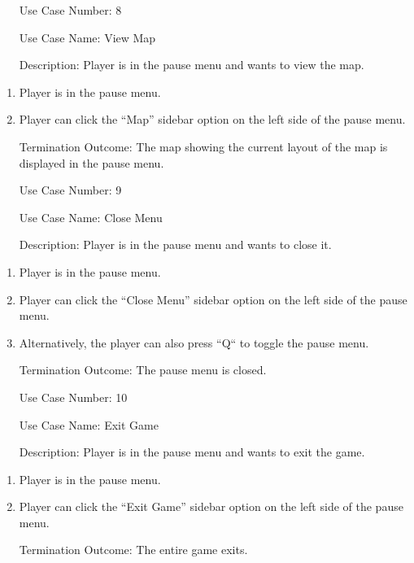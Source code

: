 \documentclass[10pt,conference,onecolumn,compsoc]{IEEEtran}
\begin{document}
\begin{itemize}
\item[Use Case Number:] 8
\item[Use Case Name:] View Map
\item[Description:] Player is in the pause menu and wants to view the map.
\end{itemize}
\begin{enumerate}
\item Player is in the pause menu.
\item Player can click the “Map” sidebar option on the left side of the pause menu.
\item [Termination Outcome:] The map showing the current layout of the map is displayed in the pause menu.
\end{enumerate}

\begin{itemize}
\item[Use Case Number:] 9
\item[Use Case Name:] Close Menu
\item[Description:] Player is in the pause menu and wants to close it.
\end{itemize}
\begin{enumerate}
\item Player is in the pause menu.
\item Player can click the “Close Menu” sidebar option on the left side of the pause menu.
\item Alternatively, the player can also press “Q“ to toggle the pause menu.
\item [Termination Outcome:] The pause menu is closed.
\end{enumerate}

\begin{itemize}
\item[Use Case Number:] 10
\item[Use Case Name:] Exit Game
\item[Description:] Player is in the pause menu and wants to exit the game.
\end{itemize}
\begin{enumerate}
\item Player is in the pause menu.
\item Player can click the “Exit Game” sidebar option on the left side of the pause menu.
\item [Termination Outcome:] The entire game exits.
\end{enumerate}
\end{document}
